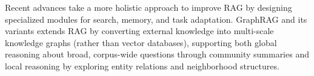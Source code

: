 Recent advances take a more holistic approach to improve RAG by designing specialized modules for search, memory, and task adaptation. 
GraphRAG and its variants extends RAG by converting external knowledge into multi-scale knowledge graphs (rather than vector databases), supporting both global reasoning about broad, corpus-wide questions through community summaries and local reasoning by exploring entity relations and neighborhood structures. 




